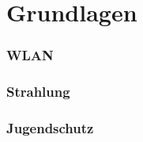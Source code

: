 \section{Grundlagen}
\subsubsection{WLAN}
\subsubsection{Strahlung}
\subsubsection{Jugendschutz}
\blindtext[3]